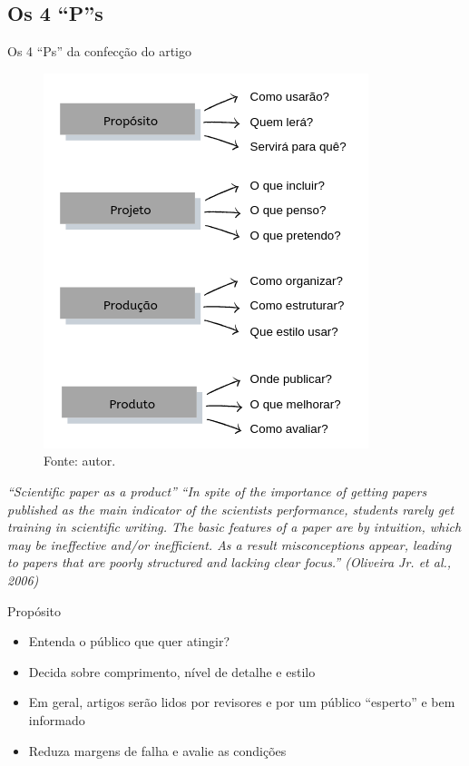 \subsection*{Os 4 ``P''s}

\begin{frame}{Os 4 ``Ps'' da confecção do artigo}
\begin{figure}
\centering
\includegraphics[scale=0.65]{figs/05/4ps}
\caption{Fonte: autor.}
\end{figure}
\end{frame}

\begin{frame}
\begin{block}{\emph{``Scientific paper as a product''}}
\emph{``In spite of the importance of getting papers published as the main indicator of the scientists performance, students rarely get training in scientific writing. The basic features of a paper are  by intuition, which may be ineffective and/or inefficient. As a result misconceptions appear, leading to papers that are poorly structured and lacking clear focus.'' (Oliveira Jr. et al., 2006)}
\end{block}
\end{frame}

\begin{frame}{Propósito}
\begin{itemize}
\item Entenda o público que quer atingir? 
\item Decida sobre comprimento, nível de detalhe e estilo 
\item Em geral, artigos serão lidos por revisores e por um público ``esperto'' e bem informado
\item Reduza margens de falha e avalie as condições
\end{itemize}
\end{frame}

